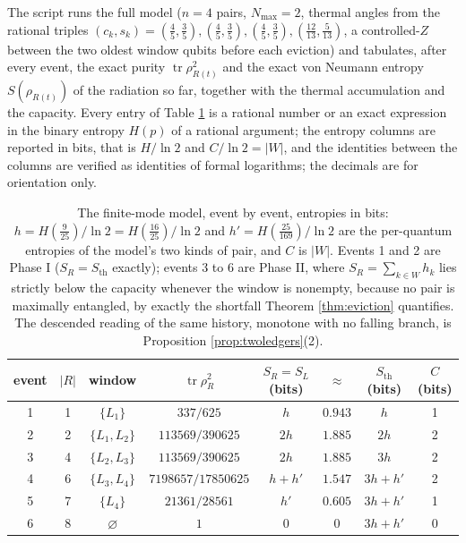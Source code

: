 \documentclass[11pt]{article}
\theoremstyle{definition}
\newcommand{\Sth}{S_{\mathrm{th}}}
\newcommand{\tr}{\operatorname{tr}}
\begin{document}
The script runs the full model ($n = 4$ pairs, $N_{\max} = 2$, thermal angles from the rational triples $(c_k, s_k) = (\tfrac45, \tfrac35), (\tfrac45, \tfrac35), (\tfrac45, \tfrac35), (\tfrac{12}{13}, \tfrac{5}{13})$, a controlled-$Z$ between the two oldest window qubits before each eviction) and tabulates, after every event, the exact purity $\tr\rho_{R(t)}^{2}$ and the exact von Neumann entropy $S(\rho_{R(t)})$ of the radiation so far, together with the thermal accumulation and the capacity. Every entry of Table \ref{tab:model} is a rational number or an exact expression in the binary entropy $H(p)$ of a rational argument; the entropy columns are reported in bits, that is $H/\ln 2$ and $C/\ln 2 = |W|$, and the identities between the columns are verified as identities of formal logarithms; the decimals are for orientation only.

\begin{table}[htbp]
\centering
\footnotesize
\begin{tabular}{cccccccc}
\toprule
event & $|R|$ & window & $\tr\rho_R^{2}$ & $S_R = S_L$ (bits) & $\approx$ & $\Sth$ (bits) & $C$ (bits) \\
\midrule
1 & 1 & $\{L_1\}$ & $337/625$ & $h$ & $0.943$ & $h$ & 1 \\
2 & 2 & $\{L_1, L_2\}$ & $113569/390625$ & $2h$ & $1.885$ & $2h$ & 2 \\
3 & 4 & $\{L_2, L_3\}$ & $113569/390625$ & $2h$ & $1.885$ & $3h$ & 2 \\
4 & 6 & $\{L_3, L_4\}$ & $7198657/17850625$ & $h + h'$ & $1.547$ & $3h + h'$ & 2 \\
5 & 7 & $\{L_4\}$ & $21361/28561$ & $h'$ & $0.605$ & $3h + h'$ & 1 \\
6 & 8 & $\varnothing$ & $1$ & $0$ & $0$ & $3h + h'$ & 0 \\
\bottomrule
\end{tabular}
\caption{The finite-mode model, event by event, entropies in bits: $h = H(\tfrac{9}{25})/\ln 2 = H(\tfrac{16}{25})/\ln 2$ and $h' = H(\tfrac{25}{169})/\ln 2$ are the per-quantum entropies of the model's two kinds of pair, and $C$ is $|W|$. Events 1 and 2 are Phase I ($S_R = \Sth$ exactly); events 3 to 6 are Phase II, where $S_R = \sum_{k \in W}h_k$ lies strictly below the capacity whenever the window is nonempty, because no pair is maximally entangled, by exactly the shortfall Theorem \ref{thm:eviction} quantifies. The descended reading of the same history, monotone with no falling branch, is Proposition \ref{prop:twoledgers}(2).}
\label{tab:model}
\end{table}
\end{document}
